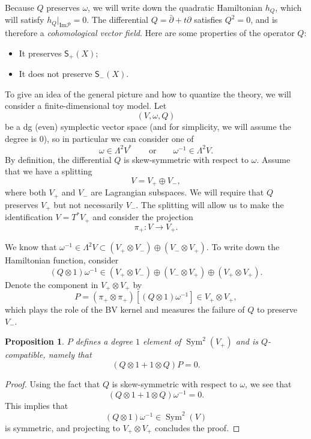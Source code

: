 \documentclass[article,10pt,oneside,oldfontcommands]{memoir}
\newtheorem{prop}[thm]{Proposition}
\theoremstyle{definition}
\theoremstyle{remark}
\theoremstyle{plain}
\theoremstyle{definition}
\theoremstyle{remark}
\newcommand{\Ima}{\mathrm{Im}}
\newcommand{\mc}[1]{\mathcal{#1}}
\newcommand{\on}[1]{\operatorname{#1}}
\newcommand{\ms}[1]{\mathsf{#1}}
\newcommand{\1}{\mathbf{1}}
\newcommand{\2}{\mathbf{2}}
\newcommand{\3}{\mathbf{3}}
\newcommand{\dbar}{\bar{\partial}}
\begin{document}
Because \(Q\) preserves \(\omega\), we will write down the quadratic Hamiltonian \(h_Q\), which will satisfy \(h_Q|_{\Ima \mc{P}} = 0\). The differential \(Q = \dbar + t \partial\) satisfies \(Q^2 = 0\), and is therefore a \textit{cohomological vector field}. Here are some properties of the operator \(Q\):
\begin{itemize}
    \item It preserves \(\ms{S}_+(X)\);
    \item It does not preserve \(\ms{S}_-(X)\).
\end{itemize}

To give an idea of the general picture and how to quantize the theory, we will consider a finite-dimensional toy model. Let
\[ (V, \omega, Q) \]
be a dg (even) symplectic vector space (and for simplicity, we will assume the degree is \(0\)), so in particular we can consider one of
\[ \omega \in \Lambda^2 V^* \qquad \text{or} \qquad \omega^{-1} \in \Lambda^2 V. \]
By definition, the differential \(Q\) is skew-symmetric with respect to \(\omega\). Assume that we have a splitting
\[ V = V_+ \oplus V_-, \]
where both \(V_+\) and \(V_-\) are Lagrangian subspaces. We will require that \(Q\) preserves \(V_+\) but not necessarily \(V_-\). The splitting will allow us to make the identification \(V = T^* V_+\) and consider the projection
\[ \pi_+ \colon V \to V_+. \]

We know that \(\omega^{-1} \in \Lambda^2 V \subset (V_+ \otimes V_-) \oplus (V_- \otimes V_+)\). To write down the Hamiltonian function, consider
\[ (Q \otimes 1) \omega^{-1} \in (V_+ \otimes V_-) \oplus (V_- \otimes V_+) \oplus (V_+ \otimes V_+). \]
Denote the component in \(V_+ \otimes V_+\) by
\[ P = (\pi_+ \otimes \pi_+) [(Q \otimes 1) \omega^{-1}] \in V_+ \otimes V_+, \]
which plays the role of the BV kernel and measures the failure of \(Q\) to preserve \(V_-\).

\begin{prop}
    \(P\) defines a degree \(1\) element of \(\on{Sym}^2(V_+)\) and is \(Q\)-compatible, namely that
    \[ (Q \otimes 1 + 1 \otimes Q) P = 0. \]
\end{prop}

\begin{proof}
    Using the fact that \(Q\) is skew-symmetric with respect to \(\omega\), we see that
    \[ (Q \otimes 1 + 1 \otimes Q) \omega^{-1} = 0. \]
    This implies that
    \[ (Q \otimes 1) \omega^{-1} \in \on{Sym}^2(V) \]
    is symmetric, and projecting to \(V_+ \otimes V_+\) concludes the proof.
\end{proof}
\end{document}
